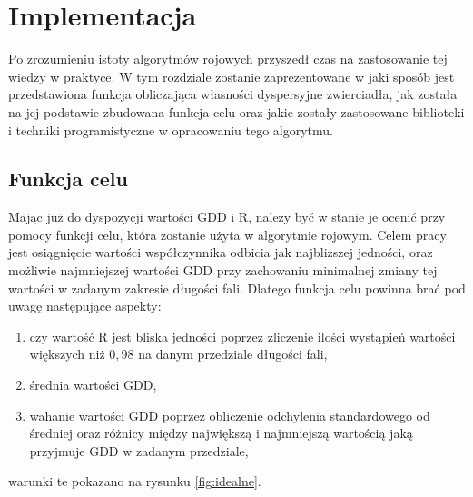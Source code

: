 \chapter{Implementacja}

Po zrozumieniu istoty algorytmów rojowych przyszedł czas na zastosowanie tej wiedzy w praktyce. W tym rozdziale zostanie zaprezentowane w jaki sposób jest przedstawiona funkcja obliczająca własności dyspersyjne zwierciadła, jak została na jej podstawie zbudowana funkcja celu oraz jakie zostały zastosowane biblioteki i techniki programistyczne w opracowaniu tego algorytmu.



\section{Funkcja celu} \label{sect:cel}

Mając już do dyspozycji wartości GDD i R, należy być w stanie je ocenić przy pomocy funkcji celu, która zostanie użyta w algorytmie rojowym. Celem pracy jest osiągnięcie wartości współczynnika odbicia jak najbliższej jedności, oraz możliwie najmniejszej wartości GDD przy zachowaniu minimalnej zmiany tej wartości w zadanym zakresie długości fali. Dlatego funkcja celu powinna brać pod uwagę następujące aspekty:
\begin{enumerate}
    \item czy wartość R jest bliska jedności poprzez zliczenie ilości wystąpień wartości większych niż $0,98$ na danym przedziale długości fali,
    \item średnia wartości GDD,
    \item wahanie wartości GDD poprzez obliczenie odchylenia standardowego od średniej oraz różnicy między największą i najmniejszą wartością jaką przyjmuje GDD w zadanym przedziale,
\end{enumerate}
warunki te pokazano na rysunku \ref{fig:idealne}. 

